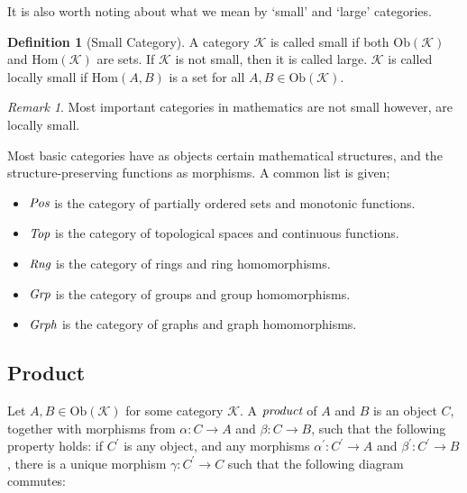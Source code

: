 \documentclass[10pt, oneside, reqno]{amsart}
\theoremstyle{plain}%
\theoremstyle{definition}
\newtheorem{defn}[thm]{Definition}
\theoremstyle{remark}
\newtheorem*{rem}{Remark}
\newcommand{\Cat}{\mathcal{K}}
\begin{document}
It is also worth noting about what we mean by `small' and `large' categories.

\begin{defn}[Small Category]
	A category $\Cat$ is called small if both $\text{Ob}(\Cat)$ and $\text{Hom}(\Cat)$ are sets.
	If $\Cat$ is not small, then it is called large.
	$\Cat$ is called locally small if $\text{Hom}(A,B)$ is a set for all $A, B \in \text{Ob}(\Cat)$.
\end{defn}

\begin{rem}
	Most important categories in mathematics are not small however, are locally small.
\end{rem}

Most basic categories have as objects certain mathematical structures, and the structure-preserving
functions as morphisms. A common list is given;
\begin{itemize}
\item $\emph{Pos}$ is the category of partially ordered sets and monotonic functions.
\item $\emph{Top}$ is the category of topological spaces and continuous functions.
\item $\emph{Rng}$ is the category of rings and ring homomorphisms.
\item $\emph{Grp}$ is the category of groups and group homomorphisms.
\item $\emph{Grph}$ is the category of graphs and graph homomorphisms.
\end{itemize}

\subsection{Product} %
\label{subsec:product}
Let $A,B \in \text{Ob}(\mathcal{K})$ for some category $\mathcal{K}$.
A $\emph{product}$ of $A$ and $B$ is an object $C$, together with morphisms from
$\alpha: C \to A$ and $\beta: C \to B$, such that the following property holds:
if $C^{'}$ is any object, and any morphisms $\alpha^{'}: C^{'} \to A$ and $\beta^{'}: C^{'} \to B$,
there is a unique morphism $\gamma: C^{'} \to C$ such that the following diagram commutes:

\end{document}
